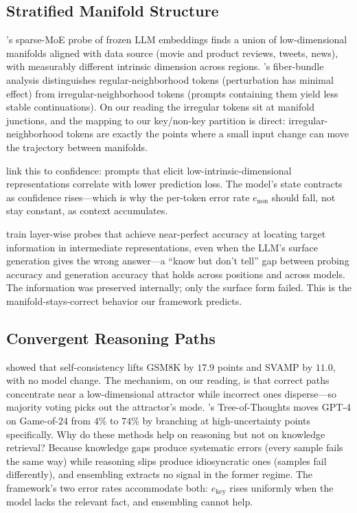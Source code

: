 \subsection{Stratified Manifold Structure}

\citet{li2025unraveling}'s sparse-MoE probe of frozen LLM embeddings finds a union of low-dimensional manifolds aligned with data source (movie and product reviews, tweets, news), with measurably different intrinsic dimension across regions. \citet{robinson2025token}'s fiber-bundle analysis distinguishes regular-neighborhood tokens (perturbation has minimal effect) from irregular-neighborhood tokens (prompts containing them yield less stable continuations). On our reading the irregular tokens sit at manifold junctions, and the mapping to our key/non-key partition is direct: irregular-neighborhood tokens are exactly the points where a small input change can move the trajectory between manifolds.

\citet{viswanathan2024geometry} link this to confidence: prompts that elicit low-intrinsic-dimensional representations correlate with lower prediction loss. The model's state contracts as confidence rises---which is why the per-token error rate $e_{\text{non}}$ should fall, not stay constant, as context accumulates.

\citet{gao2024insights} train layer-wise probes that achieve near-perfect accuracy at locating target information in intermediate representations, even when the LLM's surface generation gives the wrong answer---a ``know but don't tell'' gap between probing accuracy and generation accuracy that holds across positions and across models. The information was preserved internally; only the surface form failed. This is the manifold-stays-correct behavior our framework predicts.

\subsection{Convergent Reasoning Paths}

\citet{wang2023self} showed that self-consistency lifts GSM8K by $17.9$ points and SVAMP by $11.0$, with no model change. The mechanism, on our reading, is that correct paths concentrate near a low-dimensional attractor while incorrect ones disperse---so majority voting picks out the attractor's mode. \citet{yao2023tree}'s Tree-of-Thoughts moves GPT-4 on Game-of-24 from $4\%$ to $74\%$ by branching at high-uncertainty points specifically. Why do these methods help on reasoning but not on knowledge retrieval? Because knowledge gaps produce systematic errors (every sample fails the same way) while reasoning slips produce idiosyncratic ones (samples fail differently), and ensembling extracts no signal in the former regime. The framework's two error rates accommodate both: $e_{\text{key}}$ rises uniformly when the model lacks the relevant fact, and ensembling cannot help.

